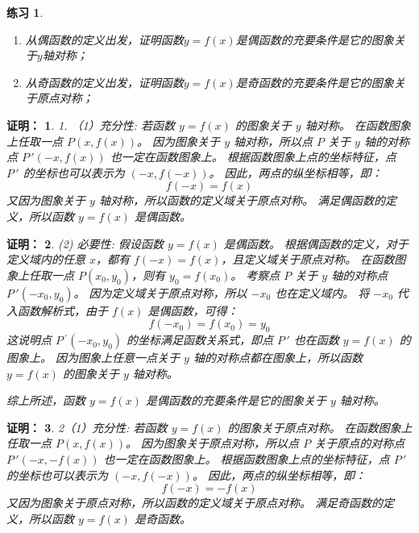 \documentclass[aspectratio=169,13pt,t] {beamer}
\newtheorem*{prooft}{证明：}
\newtheorem{exercise}{练习}
\theoremstyle{definition}
\begin{document}
\begin{frame}
	\begin{exercise}
		\begin{enumerate}[(1)]
			\item 从偶函数的定义出发，证明函数$y=f(x)$是偶函数的充要条件是它的图象关于$y$轴对称；
			\item 从奇函数的定义出发，证明函数$y=f(x)$是奇函数的充要条件是它的图象关于原点对称；
		\end{enumerate}
		
	\end{exercise}
\end{frame}

\begin{frame}
	\begin{prooft}
		1.	（1）充分性:
		若函数 $y=f(x)$ 的图象关于 $y$ 轴对称。
		在函数图象上任取一点 $P(x, f(x))$。
		因为图象关于 $y$ 轴对称，所以点 $P$ 关于 $y$ 轴的对称点 $P\,'(-x, f(x))$ 也一定在函数图象上。
		根据函数图象上点的坐标特征，点 $P\,'$ 的坐标也可以表示为 $(-x, f(-x))$。
		因此，两点的纵坐标相等，即：
		$$f(-x) = f(x)$$
		又因为图象关于 $y$ 轴对称，所以函数的定义域关于原点对称。
		满足偶函数的定义，所以函数 $y=f(x)$ 是偶函数。
		
	\end{prooft}
\end{frame}

\begin{frame}
	\begin{prooft}
		
	(2)	必要性:
		假设函数 $y=f(x)$ 是偶函数。
		根据偶函数的定义，对于定义域内的任意 $x$，都有 $f(-x) = f(x)$，且定义域关于原点对称。
		在函数图象上任取一点 $P(x_0, y_0)$，则有 $y_0 = f(x_0)$。
		考察点 $P$ 关于 $y$ 轴的对称点 $P\,'(-x_0, y_0)$。
		因为定义域关于原点对称，所以 $-x_0$ 也在定义域内。
		将 $-x_0$ 代入函数解析式，由于 $f(x)$ 是偶函数，可得：
		$$f(-x_0) = f(x_0) = y_0$$
		这说明点 $P\,^\prime(-x_0, y_0)$ 的坐标满足函数关系式，即点 $P\,'$ 也在函数 $y=f(x)$ 的图象上。
		因为图象上任意一点关于 $y$ 轴的对称点都在图象上，所以函数 $y=f(x)$ 的图象关于 $y$ 轴对称。
		
		
		综上所述，函数 $y=f(x)$ 是偶函数的充要条件是它的图象关于 $y$ 轴对称。
	\end{prooft}
\end{frame}

\begin{frame}
	\begin{prooft}
		2（1）充分性:
		若函数 $y=f(x)$ 的图象关于原点对称。
		在函数图象上任取一点 $P(x, f(x))$。
		因为图象关于原点对称，所以点 $P$ 关于原点的对称点 $P\,'(-x, -f(x))$ 也一定在函数图象上。
		根据函数图象上点的坐标特征，点 $P\,'$ 的坐标也可以表示为 $(-x, f(-x))$。
		因此，两点的纵坐标相等，即：
		$$f(-x) = -f(x)$$
		又因为图象关于原点对称，所以函数的定义域关于原点对称。
		满足奇函数的定义，所以函数 $y=f(x)$ 是奇函数。
	\end{prooft}
\end{frame}
\end{document}
